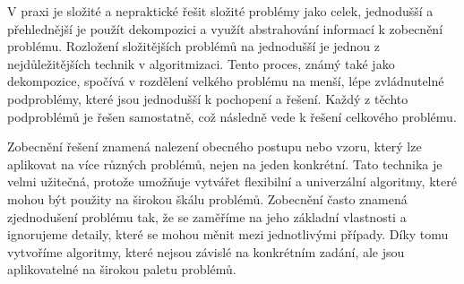 V praxi je složité a nepraktické řešit složité problémy jako celek, jednodušší a přehlednější je použít dekompozici a využít abstrahování informací k zobecnění problému. Rozložení složitějších problémů na jednodušší je jednou z nejdůležitějších technik v algoritmizaci. Tento proces, známý také jako dekompozice, spočívá v rozdělení velkého problému na menší, lépe zvládnutelné podproblémy, které jsou jednodušší k pochopení a řešení. Každý z těchto podproblémů je řešen samostatně, což následně vede k řešení celkového problému.

Zobecnění řešení znamená nalezení obecného postupu nebo vzoru, který lze aplikovat na více různých problémů, nejen na jeden konkrétní. Tato technika je velmi užitečná, protože umožňuje vytvářet flexibilní a univerzální algoritmy, které mohou být použity na širokou škálu problémů. Zobecnění často znamená zjednodušení problému tak, že se zaměříme na jeho základní vlastnosti a ignorujeme detaily, které se mohou měnit mezi jednotlivými případy. Díky tomu vytvoříme algoritmy, které nejsou závislé na konkrétním zadání, ale jsou aplikovatelné na širokou paletu problémů.


